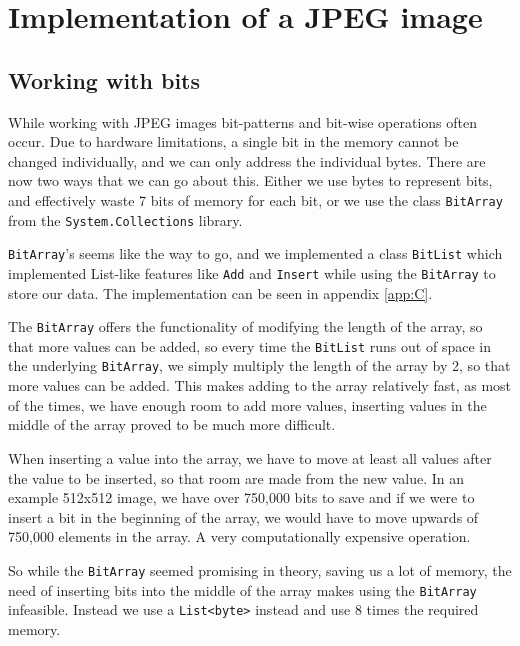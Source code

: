 \section{Implementation of a JPEG image}

\subsection{Working with bits}
While working with JPEG images bit-patterns and bit-wise operations often occur. Due to hardware limitations, a single bit in the memory cannot be changed individually, and we can only address the individual bytes. There are now two ways that we can go about this. Either we use bytes to represent bits, and effectively waste 7 bits of memory for each bit, or we use the class \lstinline|BitArray| from the \lstinline|System.Collections| library.

\lstinline|BitArray|'s seems like the way to go, and we implemented a class \lstinline|BitList| which implemented List-like features like \lstinline|Add| and \lstinline|Insert| while using the \lstinline|BitArray| to store our data. The implementation can be seen in appendix \ref{app:C}. 

The \lstinline|BitArray| offers the functionality of modifying the length of the array, so that more values can be added, so every time the \lstinline|BitList| runs out of space in the underlying \lstinline|BitArray|, we simply multiply the length of the array by 2, so that more values can be added. This makes adding to the array relatively fast, as most of the times, we have enough room to add more values, inserting values in the middle of the array proved to be much more difficult.

When inserting a value into the array, we have to move at least all values after the value to be inserted, so that room are made from the new value. In an example 512x512 image, we have over 750,000 bits to save and if we were to insert a bit in the beginning of the array, we would have to move upwards of 750,000 elements in the array. A very computationally expensive operation.

So while the \lstinline|BitArray| seemed promising in theory, saving us a lot of memory, the need of inserting bits into the middle of the array makes using the \lstinline|BitArray| infeasible. Instead we use a \lstinline|List<byte>| instead and use 8 times the required memory.